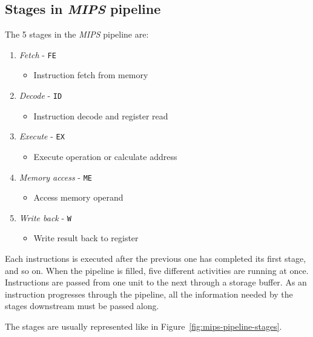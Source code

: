 \documentclass[english]{article}
\begin{document}
\subsection{Stages in \textit{MIPS} pipeline}

The 5 stages in the \textit{MIPS} pipeline are:

\begin{enumerate}
  \item \textit{Fetch} - \texttt{FE}
        \begin{itemize}[label=\(\rightarrow\)]
          \item Instruction fetch from memory
        \end{itemize}
  \item \textit{Decode} - \texttt{ID}
        \begin{itemize}[label=\(\rightarrow\)]
          \item Instruction decode and register read
        \end{itemize}
  \item \textit{Execute} - \texttt{EX}
        \begin{itemize}[label=\(\rightarrow\)]
          \item Execute operation or calculate address
        \end{itemize}
  \item \textit{Memory access} - \texttt{ME}
        \begin{itemize}[label=\(\rightarrow\)]
          \item Access memory operand
        \end{itemize}
  \item \textit{Write back} - \texttt{W}
        \begin{itemize}[label=\(\rightarrow\)]
          \item Write result back to register
        \end{itemize}
\end{enumerate}

Each instructions is executed after the previous one has completed its first stage, and so on.
When the pipeline is filled, five different activities are running at once.
Instructions are passed from one unit to the next through a storage buffer.
As an instruction progresses through the pipeline, all the information needed by the stages downstream must be passed along.

The stages are usually represented like in Figure~\ref{fig:mips-pipeline-stages}.
\end{document}
